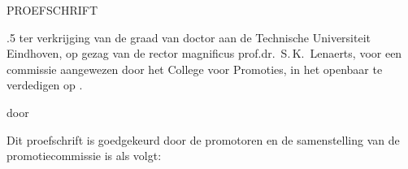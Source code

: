 \thispagestyle{empty}
{\large
\begin{center}
    \null\vfill

    {\LARGE\ThesisTitle\par}

    \vspace{0.6em}

    {\large\itshape\ThesisSubtitle\par}

    \vfill

    PROEFSCHRIFT

    \vfill

    \begin{minipage}{0.82\textwidth}
      \vbox{\emergencystretch.5\linewidth\noindent
        ter verkrijging van de graad van doctor aan de Technische Universiteit Eindhoven, op gezag van de rector magnificus prof.dr.~S.\,K.~Lenaerts, voor een commissie aangewezen door het College voor Promoties, in het openbaar te verdedigen op \ThesisDefenseDate.
      }
    \end{minipage}

    \vfill

    door

    \vfill

    \ThesisAuthor

    \vfill

    \ThesisBirthLine

    \vfill
\end{center}
}

\newpage
\thispagestyle{empty}

\noindent Dit proefschrift is goedgekeurd door de promotoren en de samenstelling van de promotiecommissie is als volgt:

\vspace{1.5em}

